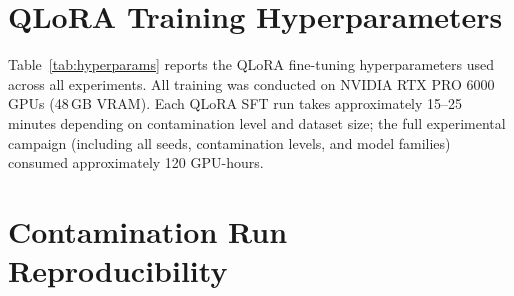 \section{QLoRA Training Hyperparameters}
\label{app:hyperparams}

Table~\ref{tab:hyperparams} reports the QLoRA fine-tuning hyperparameters used across all experiments.
All training was conducted on NVIDIA RTX PRO 6000 GPUs (48\,GB VRAM).
Each QLoRA SFT run takes approximately 15--25 minutes depending on contamination level and dataset size; the full experimental campaign (including all seeds, contamination levels, and model families) consumed approximately 120 GPU-hours.

\begin{table}[t]
\centering
\caption{QLoRA fine-tuning hyperparameters (shared across all model families and contamination conditions).}
\label{tab:hyperparams}
\footnotesize
{}
\end{table}

\section{Contamination Run Reproducibility}\label{app:reproducibility}

